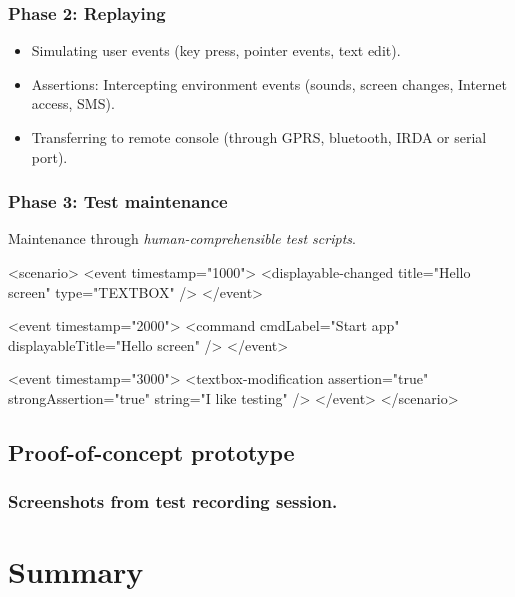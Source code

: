 \documentclass[compress]{beamer}
\begin{document}
\begin{frame}
    \frametitle{Phase 2: Replaying}

	\begin{itemize}
        \item Simulating user events (key press, pointer events, text edit).
        \item Assertions: Intercepting environment events (sounds, screen changes, Internet access, SMS).
        \item Transferring to remote console (through GPRS, bluetooth, IRDA or serial port).
	\end{itemize}
\end{frame}

\begin{frame}[containsverbatim]
    \frametitle{Phase 3: Test maintenance}

    Maintenance through \emph{human-comprehensible test scripts}.

    \bigskip
\begin{xmlblock}
<scenario>
  <event timestamp="1000">
      <displayable-changed title="Hello screen" type="TEXTBOX" />
  </event>
    
  <event timestamp="2000">
      <command cmdLabel="Start app" displayableTitle="Hello screen" />
  </event>
    
  <event timestamp="3000">        
      <textbox-modification assertion="true" strongAssertion="true" 
                            string="I like testing" />
  </event>
</scenario>
\end{xmlblock}

\end{frame}


\subsection[Prototype]{Proof-of-concept prototype} %

\begin{frame}[plain]
	\frametitle{Screenshots from test recording session.}



\end{frame}


\section*{Summary} %
\end{document}
